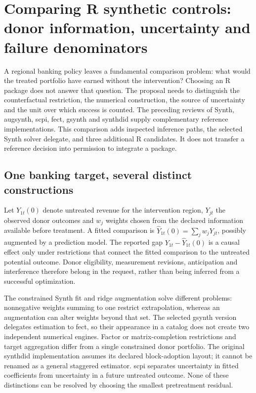 \section{Comparing R synthetic controls: donor information, uncertainty and failure denominators}
\label{sec:exec25-synthetic-r-coverage}

A regional banking policy leaves a fundamental comparison problem: what would
the treated portfolio have earned without the intervention? Choosing an R
package does not answer that question. The proposal needs to distinguish the
counterfactual restriction, the numerical construction, the source of
uncertainty and the unit over which success is counted. The preceding reviews
of Synth, augsynth, scpi, fect, gsynth and synthdid supply complementary
reference implementations. This comparison adds inspected inference paths,
the selected Synth solver delegate, and three additional R candidates. It
does not transfer a reference decision into permission to integrate a package.
\citep{exec24_synth_source,exec24_augsynth_source,exec24_scpi_source,
exec24_fect_source,exec21_gsynth_wrapper,exec23_synthdid_reuse_source,
exec25_synthr_choice}

\subsection{One banking target, several distinct constructions}
Let $Y_{1t}(0)$ denote untreated revenue for the intervention region, $Y_{jt}$
the observed donor outcomes and $w_j$ weights chosen from the declared
information available before treatment. A fitted comparison is
$\widehat Y_{1t}(0)=\sum_jw_jY_{jt}$, possibly augmented by a prediction
model. The reported gap $Y_{1t}-\widehat Y_{1t}(0)$ is a causal effect only
under restrictions that connect the fitted comparison to the untreated
potential outcome. Donor eligibility, measurement revisions, anticipation
and interference therefore belong in the request, rather than being inferred
from a successful optimization.\citep{exec25_synthr_choice}

The constrained Synth fit and ridge augmentation solve different problems:
nonnegative weights summing to one restrict extrapolation, whereas an
augmentation can alter weights beyond that set. The selected gsynth version
delegates estimation to fect, so their appearance in a catalog does not create
two independent numerical engines. Factor or matrix-completion restrictions
and target aggregation differ from a single constrained donor portfolio.
The original synthdid implementation assumes its declared block-adoption
layout; it cannot be renamed as a general staggered estimator. scpi separates
uncertainty in fitted coefficients from uncertainty in a future untreated
outcome. None of these distinctions can be resolved by choosing the smallest
pretreatment residual.\citep{exec24_synth_source,exec24_augsynth_source,
exec21_gsynth_wrapper,exec24_fect_source,exec23_synthdid_reuse_source,
exec24_scpi_source}

